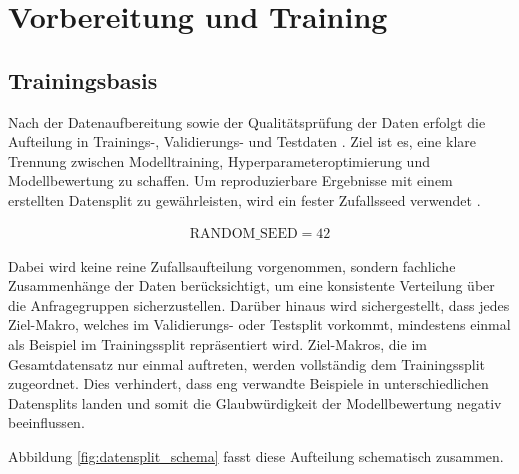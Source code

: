 ﻿\chapter{Vorbereitung und Training} 
\label{chap:datensplit_und_training}

\section{Trainingsbasis}

Nach der Datenaufbereitung sowie der Qualitätsprüfung der Daten erfolgt die Aufteilung in Trainings-, Validierungs- und Testdaten \parencite{srcStep911,srcStep913,srcIdealDataset,srcStep921}.
Ziel ist es, eine klare Trennung zwischen Modelltraining, Hyperparameteroptimierung und Modellbewertung zu schaffen. 
Um reproduzierbare Ergebnisse mit einem erstellten Datensplit zu gewährleisten, wird ein fester Zufallsseed verwendet  \parencite{srcStep921}.

\begin{align}
    \text{RANDOM\_SEED} = 42
\end{align}

Dabei wird keine reine Zufallsaufteilung vorgenommen, sondern fachliche Zusammenhänge der Daten berücksichtigt, um eine konsistente Verteilung über die Anfragegruppen sicherzustellen. 
Darüber hinaus wird sichergestellt, dass jedes Ziel-Makro, welches im Validierungs- oder Testsplit vorkommt, mindestens einmal als Beispiel im Trainingssplit repräsentiert wird.
Ziel-Makros, die im Gesamtdatensatz nur einmal auftreten, werden vollständig dem Trainingssplit zugeordnet.
Dies verhindert, dass eng verwandte Beispiele in unterschiedlichen Datensplits landen und somit die Glaubwürdigkeit der Modellbewertung negativ beeinflussen. 

Abbildung \ref{fig:datensplit_schema} fasst diese Aufteilung schematisch zusammen.

